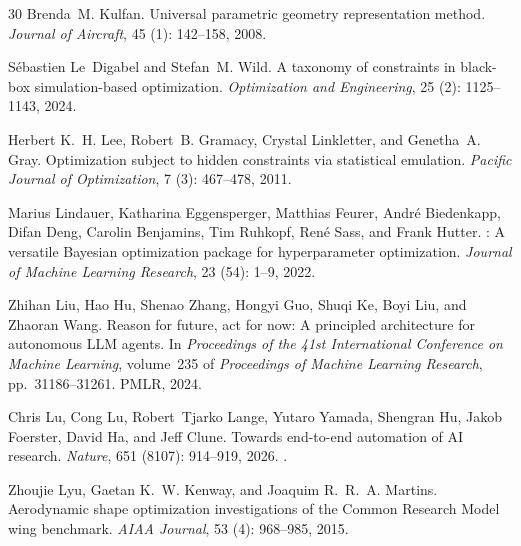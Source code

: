 \documentclass{article} %
\begin{document}
\begin{thebibliography}{30}
Brenda~M. Kulfan.
\newblock Universal parametric geometry representation method.
\newblock \emph{Journal of Aircraft}, 45 (1): 142--158, 2008.

S{\'e}bastien Le~Digabel and Stefan~M. Wild.
\newblock A taxonomy of constraints in black-box simulation-based optimization.
\newblock \emph{Optimization and Engineering}, 25 (2): 1125--1143, 2024.

Herbert K.~H. Lee, Robert~B. Gramacy, Crystal Linkletter, and Genetha~A. Gray.
\newblock Optimization subject to hidden constraints via statistical emulation.
\newblock \emph{Pacific Journal of Optimization}, 7 (3): 467--478, 2011.

Marius Lindauer, Katharina Eggensperger, Matthias Feurer, Andr{\'e} Biedenkapp, Difan Deng, Carolin Benjamins, Tim Ruhkopf, Ren{\'e} Sass, and Frank Hutter.
: A versatile {Bayesian} optimization package for hyperparameter optimization.
\newblock \emph{Journal of Machine Learning Research}, 23 (54): 1--9, 2022.

Zhihan Liu, Hao Hu, Shenao Zhang, Hongyi Guo, Shuqi Ke, Boyi Liu, and Zhaoran Wang.
\newblock Reason for future, act for now: A principled architecture for autonomous {LLM} agents.
\newblock In \emph{Proceedings of the 41st International Conference on Machine Learning}, volume~235 of \emph{Proceedings of Machine Learning Research}, pp.\  31186--31261. PMLR, 2024.

Chris Lu, Cong Lu, Robert~Tjarko Lange, Yutaro Yamada, Shengran Hu, Jakob Foerster, David Ha, and Jeff Clune.
\newblock Towards end-to-end automation of {AI} research.
\newblock \emph{Nature}, 651 (8107): 914--919, 2026.
\newblock {}.

Zhoujie Lyu, Gaetan K.~W. Kenway, and Joaquim R.~R.~A. Martins.
\newblock Aerodynamic shape optimization investigations of the {Common Research Model} wing benchmark.
\newblock \emph{AIAA Journal}, 53 (4): 968--985, 2015.


\end{thebibliography}
\end{document}
